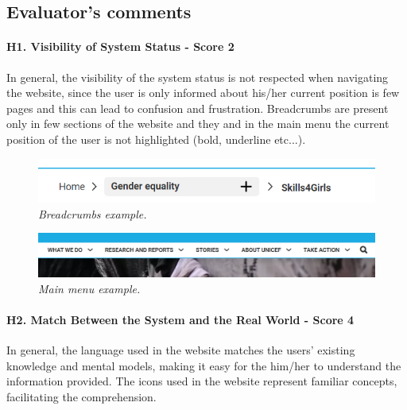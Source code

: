 \begin{small}
\begin{longtable}{l r}
\end{longtable}

\end{small}
\endgroup

\vspace{0.5cm}


\subsection*{Evaluator's comments}
\paragraph*{H1. Visibility of System Status - Score 2}
In general, the visibility of the system status is not respected when navigating the website, since the user is only informed about his/her current position is few pages and this can lead to confusion and frustration. 
Breadcrumbs are present only in few sections of the website and they and in the main menu the current position of the user is not highlighted (bold, underline etc...).

\begin{figure}[h]
	\centering
	\begin{center}
		\includegraphics{Picture1.png}
	\end{center}
	\captionsetup{font=small}
	\caption{\textit{Breadcrumbs example.}}
	\label{fig:label1}
\end{figure}

\begin{figure}[h]
	\centering
	\begin{center}
		\includegraphics[width=\textwidth]{Picture2.png}
	\end{center}
	\captionsetup{font=small}
	\caption{\textit{Main menu example.}}
	\label{fig:label2}
\end{figure}


\paragraph*{H2. Match Between the System and the Real World - Score 4}
In general, the language used in the website matches the users' existing knowledge and mental models, making it easy for the him/her to understand the information provided. The icons used in the website represent familiar concepts, facilitating the comprehension. 

